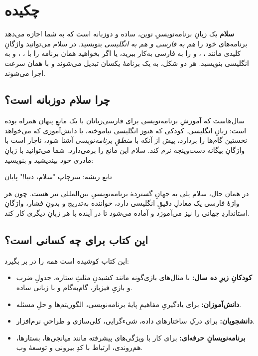 \chapter*{چکیده}

\textbf{سلام} یک زبانِ برنامه‌نویسیِ نوین، ساده و دوزبانه است که به شما اجازه
می‌دهد برنامه‌های خود را \emph{هم به فارسی و هم به انگلیسی} بنویسید. در سلام
می‌توانید واژگانِ کلیدی مانند ، ،  و 
را به فارسی به‌کار ببرید، یا اگر بخواهید همان برنامه را با ، ،
 و  به انگلیسی بنویسید. هر دو شکل، به یک برنامهٔ یکسان تبدیل
می‌شوند و با همان سرعت اجرا می‌شوند.

\section*{چرا سلام دوزبانه است؟}

سال‌هاست که آموزشِ برنامه‌نویسی برای فارسی‌زبانان با یک مانعِ پنهان همراه بوده
است: زبانِ انگلیسی. کودکی که هنوز انگلیسی نیاموخته، یا دانش‌آموزی که می‌خواهد
نخستین گام‌ها را بردارد، پیش از آنکه با \emph{منطقِ برنامه‌نویسی} آشنا شود،
ناچار است با واژگانِ بیگانه دست‌وپنجه نرم کند. سلام این مانع را برمی‌دارد. شما
می‌توانید با زبانِ مادری خود بیندیشید و بنویسید:

\begin{salamfa}
تابع ریشه:
    سرچاپ "سلام، دنیا!"
پایان
\end{salamfa}

در همان حال، سلام پلی به جهانِ گستردهٔ برنامه‌نویسیِ بین‌المللی نیز هست. چون هر
واژهٔ فارسی یک معادلِ دقیقِ انگلیسی دارد، خواننده به‌تدریج و بدونِ فشار، واژگانِ
استانداردِ جهانی را نیز می‌آموزد و آماده می‌شود تا در آینده با هر زبانِ دیگری کار
کند.

\section*{این کتاب برای چه کسانی است؟}

این کتاب کوشیده است \emph{همه} را در بر بگیرد:

\begin{itemize}
  \item \textbf{کودکانِ زیرِ ده سال:} با مثال‌های بازی‌گونه مانند کشیدنِ
        مثلثِ ستاره، جدولِ ضرب و بازیِ فیزباز، گام‌به‌گام و با زبانی ساده.
  \item \textbf{دانش‌آموزان:} برای یادگیریِ مفاهیمِ پایهٔ برنامه‌نویسی،
        الگوریتم‌ها و حلِ مسئله.
  \item \textbf{دانشجویان:} برای درکِ ساختارهای داده، شیءگرایی، کلی‌سازی
        و طراحیِ نرم‌افزار.
  \item \textbf{برنامه‌نویسانِ حرفه‌ای:} برای کار با ویژگی‌های پیشرفته مانند
        میانجی‌ها، بستارها، هم‌روندی، ارتباط با کدِ بیرونی و توسعهٔ وب.
\end{itemize}

